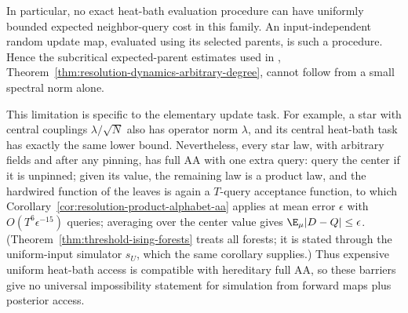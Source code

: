 In particular, no exact heat-bath evaluation procedure can have
uniformly bounded expected neighbor-query cost in this family.
An input-independent random update map, evaluated using its selected
parents, is such a procedure. Hence the subcritical expected-parent
estimates used in
,
Theorem~\ref{thm:resolution-dynamics-arbitrary-degree}, cannot follow
from a small spectral norm alone.

This limitation is specific to the elementary update task. For
example, a star with central couplings \(\lambda/\sqrt N\) also has
operator norm \(\lambda\), and its central heat-bath task has exactly
the same lower bound. Nevertheless, every star law, with arbitrary
fields and after any pinning, has full AA with one extra query: query
the center if it is unpinned; given its value, the remaining law is a
product law, and the hardwired function of the leaves is again a
\(T\)-query acceptance function, to which
Corollary~\ref{cor:resolution-product-alphabet-aa} applies at mean
error \(\epsilon\) with \(O(T^6\epsilon^{-15})\) queries; averaging over
the center value gives \(\E_\mu|D-Q|\le\epsilon\).
(Theorem~\ref{thm:threshold-ising-forests} treats all forests; it is
stated through the uniform-input simulator \(s_U\), which the same
corollary supplies.) Thus expensive uniform heat-bath access is
compatible with hereditary full AA, so these barriers give no universal
impossibility statement for simulation from forward maps plus
posterior access.
